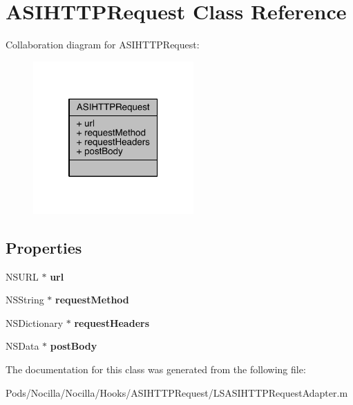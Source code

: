 \hypertarget{interface_a_s_i_h_t_t_p_request}{\section{A\-S\-I\-H\-T\-T\-P\-Request Class Reference}
\label{interface_a_s_i_h_t_t_p_request}
}


Collaboration diagram for A\-S\-I\-H\-T\-T\-P\-Request\-:\nopagebreak
\begin{figure}[H]
\begin{center}
\leavevmode
\includegraphics[width=174pt]{interface_a_s_i_h_t_t_p_request__coll__graph}
\end{center}
\end{figure}
\subsection*{Properties}
\begin{DoxyCompactItemize}
\item 
\hypertarget{interface_a_s_i_h_t_t_p_request_a15898b64d4285f5d3c056c00d364f180}{N\-S\-U\-R\-L $\ast$ {\bfseries url}}\label{interface_a_s_i_h_t_t_p_request_a15898b64d4285f5d3c056c00d364f180}

\item 
\hypertarget{interface_a_s_i_h_t_t_p_request_a183ba52708768893353fb1a9c49a8e36}{N\-S\-String $\ast$ {\bfseries request\-Method}}\label{interface_a_s_i_h_t_t_p_request_a183ba52708768893353fb1a9c49a8e36}

\item 
\hypertarget{interface_a_s_i_h_t_t_p_request_a4aa1620d207e713c8165b6dcd996a26f}{N\-S\-Dictionary $\ast$ {\bfseries request\-Headers}}\label{interface_a_s_i_h_t_t_p_request_a4aa1620d207e713c8165b6dcd996a26f}

\item 
\hypertarget{interface_a_s_i_h_t_t_p_request_a66b974b830a9fd8562aa92db88413af7}{N\-S\-Data $\ast$ {\bfseries post\-Body}}\label{interface_a_s_i_h_t_t_p_request_a66b974b830a9fd8562aa92db88413af7}

\end{DoxyCompactItemize}


The documentation for this class was generated from the following file\-:\begin{DoxyCompactItemize}
\item 
Pods/\-Nocilla/\-Nocilla/\-Hooks/\-A\-S\-I\-H\-T\-T\-P\-Request/L\-S\-A\-S\-I\-H\-T\-T\-P\-Request\-Adapter.\-m\end{DoxyCompactItemize}
